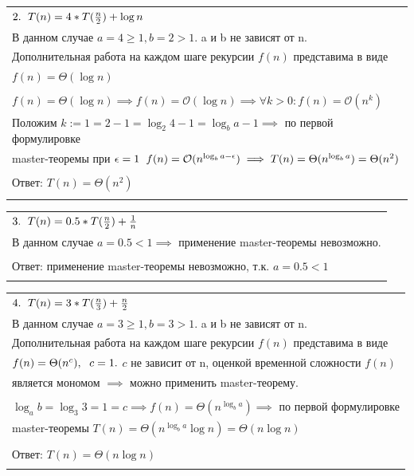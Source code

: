 \documentclass[11pt,a4paper]{article} %
\begin{document}
\begin{tabular}{l}
    $ 2. \hspace*{6pt} T(n) = 4 * T(\frac{n}{2}) + \log n $ \\
    В данном случае $ a = 4 \ge 1, b = 2 > 1. $ a и b не зависят от n. \\
    Дополнительная работа на каждом шаге рекурсии $ f(n) $ представима в виде \\
    $ f(n) = \Theta(\log n) $ \\
    \\
    $ f(n) = \Theta(\log n) \implies f(n) = \mathcal{O}(\log n) \implies \forall k > 0: f(n) = \mathcal{O}(n^{k}) $ \\
    Положим $ k := 1 = 2 - 1 = \log_2 4 - 1 = \log_b a - 1 \implies $ по первой формулировке \\
    master-теоремы при $ \epsilon = 1 \hspace*{6pt} f(n) = \mathcal{O}(n^{\log_b a - \epsilon}) \implies T(n) = \Theta(n^{\log_b a}) = \Theta(n^2) $ \\
    \\
    Ответ: $ T(n) = \Theta(n^2) $ \\
    \\
\end{tabular}

\begin{tabular}{l}
    $ 3. \hspace*{6pt} T(n) = 0.5 * T(\frac{n}{2}) + \frac{1}{n} $ \\
    В данном случае $ a = 0.5 < 1 \implies $ применение master-теоремы невозможно. \\
    \\
    Ответ: применение master-теоремы невозможно, т.к. $ a = 0.5 < 1 $ \\
    \\
\end{tabular}

\begin{tabular}{l}
    $ 4. \hspace*{6pt} T(n) = 3 * T(\frac{n}{3}) + \frac{n}{2} $ \\
    В данном случае $ a = 3 \ge 1, b = 3 > 1. $ a и b не зависят от n. \\
    Дополнительная работа на каждом шаге рекурсии $ f(n) $ представима в виде \\
    $ f(n) = \Theta(n^{c}), \hspace*{6pt} c = 1. $ $ c $ не зависит от n, оценкой временной сложности $ f(n) $ \\
    является мономом $ \implies $ можно применить master-теорему. \\
    \\
    $ \log_a b = \log_3 3 = 1 = c \implies f(n) = \Theta(n^{\log_b a}) \implies $ по первой формулировке \\
    master-теоремы $ T(n) = \Theta(n^{\log_b a} \log n) = \Theta(n \log n) $ \\
    \\
    Ответ: $ T(n) = \Theta(n \log n) $ \\
    \\
\end{tabular}
\end{document}

